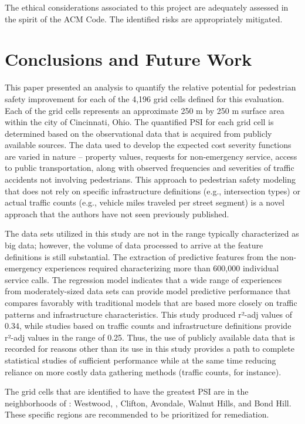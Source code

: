 \documentclass{llncs}
\begin{document}
The ethical considerations associated to this project are adequately assessed in the spirit of the ACM Code. The identified risks are appropriately mitigated.
%
\section{Conclusions and Future Work}
%

This paper presented an analysis to quantify the relative potential for pedestrian safety improvement for each of the 4,196 grid cells defined for this evaluation. Each of the grid cells represents an approximate 250 m by 250 m surface area within the city of Cincinnati, Ohio. The quantified PSI for each grid cell is determined based on the observational data that is acquired from publicly available sources. The data used to develop the expected cost severity functions are varied in nature – property values, requests for non-emergency service, access to public transportation, along with observed frequencies and severities of traffic accidents not involving pedestrians. This approach to pedestrian safety modeling that does not rely on specific infrastructure definitions (e.g., intersection types) or actual traffic counts (e.g., vehicle miles traveled per street segment) is a novel approach that the authors have not seen previously published.

The data sets utilized in this study are not in the range typically characterized as big data; however, the volume of data processed to arrive at the feature definitions is still substantial.  The extraction of predictive features from the non-emergency experiences required characterizing more than 600,000 individual service calls. The regression model indicates that a wide range of experiences from moderately-sized data sets can provide model predictive performance that compares favorably with traditional models that are based more closely on traffic patterns and infrastructure characteristics. This study produced r²-adj values of 0.34, while studies based on traffic counts and infrastructure definitions provide r²-adj values in the range of 0.25. Thus, the use of publicly available data that is recorded for reasons other than its use in this study provides a path to complete statistical studies of sufficient performance while at the same time reducing reliance on more costly data gathering methods (traffic counts, for instance).

The grid cells that are identified to have the greatest PSI are in the neighborhoods of :  Westwood, , Clifton, Avondale, Walnut Hills, and Bond Hill. These specific regions are recommended to be prioritized for remediation.
\end{document}

